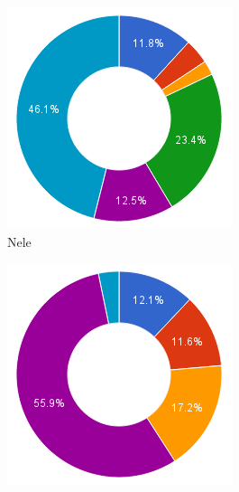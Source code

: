 \documentclass[eind]{penoverslag}
\begin{document}
\begin{figure}
        \centering
        \begin{subfigure}[hb]{0.15\textwidth}
                \centering
                \includegraphics[width=\textwidth]{werk_Nele}
                \caption{Nele}
        \end{subfigure}%
        \begin{subfigure}[hb]{0.15\textwidth}
                \centering
                \includegraphics[width=\textwidth]{werk_Toon}

\end{subfigure}
\end{figure}
\end{document}
